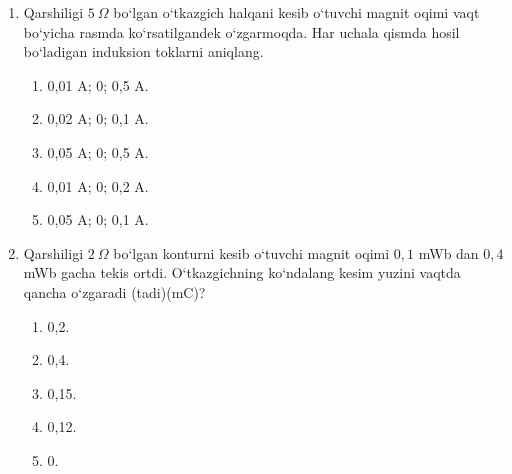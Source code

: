 \begin{enumerate}
\item Qarshiligi $5~\Omega$ bo‘lgan o‘tkazgich halqani kesib o‘tuvchi magnit oqimi vaqt bo‘yicha rasmda ko‘rsatilgandek o‘zgarmoqda. Har uchala qismda hosil bo‘ladigan induksion toklarni aniqlang.


\begin{enumerate}[label=\Alph*)]
\item 0,01 A; 0; 0,5 A.
\item 0,02 A; 0; 0,1 A.
\item 0,05 A; 0; 0,5 A.
\item 0,01 A; 0; 0,2 A.
\item 0,05 A; 0; 0,1 A.
\end{enumerate}

\item Qarshiligi $2~\Omega$ bo‘lgan konturni kesib o‘tuvchi magnit oqimi $0,1$ mWb dan $0,4$ mWb gacha tekis ortdi. O‘tkazgichning ko‘ndalang kesim yuzini vaqtda qancha o‘zgaradi (tadi)(mC)?
\begin{enumerate}[label=\Alph*)]
\item 0,2.
\item 0,4.
\item 0,15.
\item 0,12.
\item 0.
\end{enumerate}


\end{enumerate}
